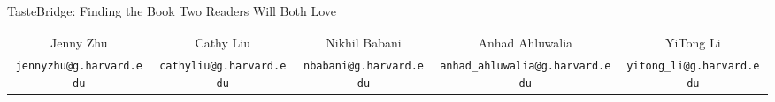 \documentclass[10pt, letterpaper]{article}
\begin{document}
\thispagestyle{firstpage}

\begin{center}
  {\LARGE TasteBridge: Finding the Book Two Readers Will Both Love}\\[4pt]
  {\small
  \begin{tabular}{@{}ccccc@{}}
    Jenny Zhu & Cathy Liu & Nikhil Babani & Anhad Ahluwalia & YiTong Li \\
    \scriptsize\texttt{jennyzhu@g.harvard.edu} &
    \scriptsize\texttt{cathyliu@g.harvard.edu} &
    \scriptsize\texttt{nbabani@g.harvard.edu} &
    \scriptsize\texttt{anhad\_ahluwalia@g.harvard.edu} &
    \scriptsize\texttt{yitong\_li@g.harvard.edu}
  \end{tabular}}
\end{center}
\vspace{-6pt}


\begin{multicols}{2}


\end{multicols}
\end{document}
